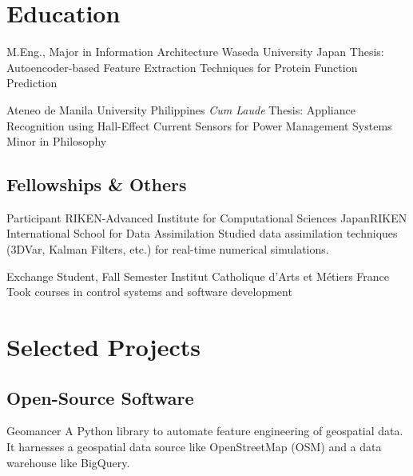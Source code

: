 \documentclass[11pt,a4paper,sans]{moderncv}
\begin{document}
\section{Education}
        {M.Eng., Major in Information Architecture}
        {Waseda University}
        {Japan}{}
        {Thesis: Autoencoder-based Feature Extraction Techniques for Protein
        Function Prediction}

        {Ateneo de Manila University}
        {Philippines}
        {\textit{Cum Laude}}
        {
        Thesis: Appliance Recognition using Hall-Effect Current Sensors for
        Power Management Systems\\
        Minor in Philosophy
        }


\subsection{Fellowships \& Others}

        {Participant}
        {RIKEN-Advanced Institute for Computational Sciences}
        {Japan}{RIKEN International School for Data Assimilation}
        {Studied data assimilation techniques (3DVar, Kalman Filters, etc.) for real-time numerical simulations.}

        {Exchange Student, Fall Semester}
        {Institut Catholique d'Arts et M\'etiers}
        {France}{}
        {Took courses in control systems and software development}

\section{Selected Projects}

\subsection{Open-Source Software}


        {\color{blue}
        }
        {Geomancer}{}{}
        {
        A Python library to automate feature engineering of geospatial data. It
        harnesses a geospatial data source like OpenStreetMap (OSM) and a data
        warehouse like BigQuery.
        }
\end{document}
